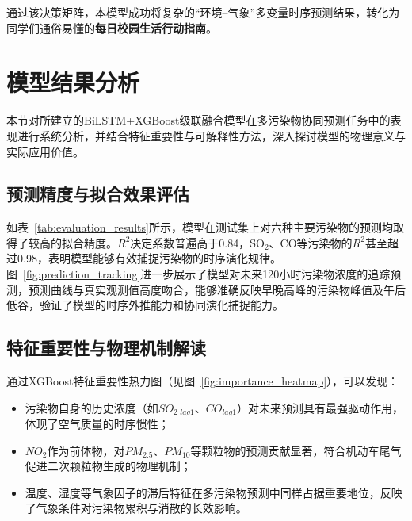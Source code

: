 \documentclass[a4paper, 12pt]{ctexart} %
\begin{document}
通过该决策矩阵，本模型成功将复杂的“环境--气象”多变量时序预测结果，转化为同学们通俗易懂的\textbf{每日校园生活行动指南}。


\section{模型结果分析}

本节对所建立的BiLSTM+XGBoost级联融合模型在多污染物协同预测任务中的表现进行系统分析，并结合特征重要性与可解释性方法，深入探讨模型的物理意义与实际应用价值。

\subsection{预测精度与拟合效果评估}
如表~\ref{tab:evaluation_results}所示，模型在测试集上对六种主要污染物的预测均取得了较高的拟合精度。$R^2$决定系数普遍高于0.84，SO$_2$、CO等污染物的$R^2$甚至超过0.98，表明模型能够有效捕捉污染物的时序演化规律。图~\ref{fig:prediction_tracking}进一步展示了模型对未来120小时污染物浓度的追踪预测，预测曲线与真实观测值高度吻合，能够准确反映早晚高峰的污染物峰值及午后低谷，验证了模型的时序外推能力和协同演化捕捉能力。

\subsection{特征重要性与物理机制解读}
通过XGBoost特征重要性热力图（见图~\ref{fig:importance_heatmap}），可以发现：
\begin{itemize}
    \item 污染物自身的历史浓度（如$SO_{2\_lag1}$、$CO_{lag1}$）对未来预测具有最强驱动作用，体现了空气质量的时序惯性；
    \item $NO_2$作为前体物，对$PM_{2.5}$、$PM_{10}$等颗粒物的预测贡献显著，符合机动车尾气促进二次颗粒物生成的物理机制；
    \item 温度、湿度等气象因子的滞后特征在多污染物预测中同样占据重要地位，反映了气象条件对污染物累积与消散的长效影响。
\end{itemize}
\end{document}
